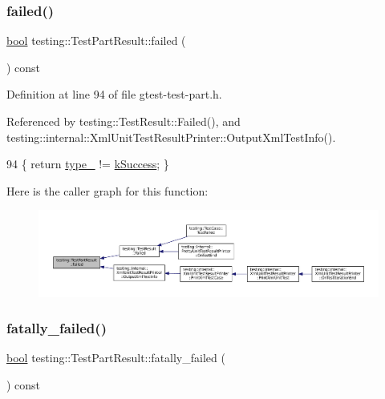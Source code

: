 \subsubsection{\texorpdfstring{failed()}{failed()}}
{\footnotesize\ttfamily \hyperlink{classbool}{bool} testing\+::\+Test\+Part\+Result\+::failed (\begin{DoxyParamCaption}{ }\end{DoxyParamCaption}) const\hspace{0.3cm}{\ttfamily [inline]}}



Definition at line 94 of file gtest-\/test-\/part.\+h.



Referenced by testing\+::\+Test\+Result\+::\+Failed(), and testing\+::internal\+::\+Xml\+Unit\+Test\+Result\+Printer\+::\+Output\+Xml\+Test\+Info().


\begin{DoxyCode}
94 \{ \textcolor{keywordflow}{return} \hyperlink{classtesting_1_1TestPartResult_a4ee7ac490fe4f10e222fa08c3fa25437}{type\_} != \hyperlink{classtesting_1_1TestPartResult_a65ae656b33fdfdfffaf34858778a52d5a8fa3d06b2baad8bf7c1f17dea314983e}{kSuccess}; \}
\end{DoxyCode}
Here is the caller graph for this function\+:
\nopagebreak
\begin{figure}[H]
\begin{center}
\leavevmode
\includegraphics[width=350pt]{classtesting_1_1TestPartResult_aa04b377c3e7ed57d39e882df5561ac90_icgraph}
\end{center}
\end{figure}
\mbox{\label{classtesting_1_1TestPartResult_a77db157eff9531c3c00c2420502f9a89}} 
\subsubsection{\texorpdfstring{fatally\+\_\+failed()}{fatally\_failed()}}
{\footnotesize\ttfamily \hyperlink{classbool}{bool} testing\+::\+Test\+Part\+Result\+::fatally\+\_\+failed (\begin{DoxyParamCaption}{ }\end{DoxyParamCaption}) const\hspace{0.3cm}{\ttfamily [inline]}}



